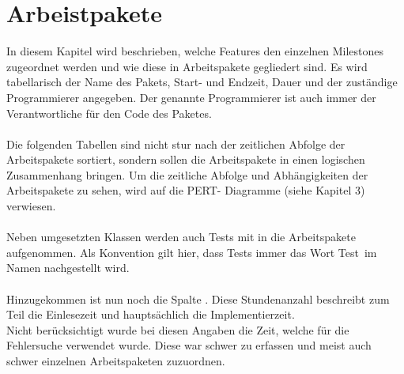 \chapter{Arbeistpakete}
In diesem Kapitel wird beschrieben, welche Features den einzelnen Milestones zugeordnet werden und wie diese in Arbeitspakete gegliedert sind. Es
wird tabellarisch der Name des Pakets, Start- und Endzeit, Dauer und der zuständige
Programmierer angegeben. Der genannte Programmierer ist auch immer der Verantwortliche
für den Code des Paketes.\\
\ \\
Die folgenden Tabellen sind nicht stur nach der zeitlichen Abfolge der Arbeitspakete sortiert,
sondern sollen die Arbeitspakete in einen logischen Zusammenhang bringen. Um die
zeitliche Abfolge und Abhängigkeiten der Arbeitspakete zu sehen, wird auf die PERT-
Diagramme (siehe Kapitel 3) verwiesen.\\
\ \\
Neben umgesetzten Klassen werden auch Tests mit in die Arbeitspakete aufgenommen.
Als Konvention gilt hier, dass Tests immer das Wort
\glqq Test\grqq \ im Namen nachgestellt wird.\ \\
\ \\
Hinzugekommen ist nun noch die Spalte . Diese Stundenanzahl beschreibt zum Teil die Einlesezeit und hauptsächlich die Implementierzeit.\\
Nicht berücksichtigt wurde bei diesen Angaben die Zeit, welche für die Fehlersuche verwendet wurde. Diese war schwer zu erfassen und meist auch schwer einzelnen Arbeitspaketen zuzuordnen.



